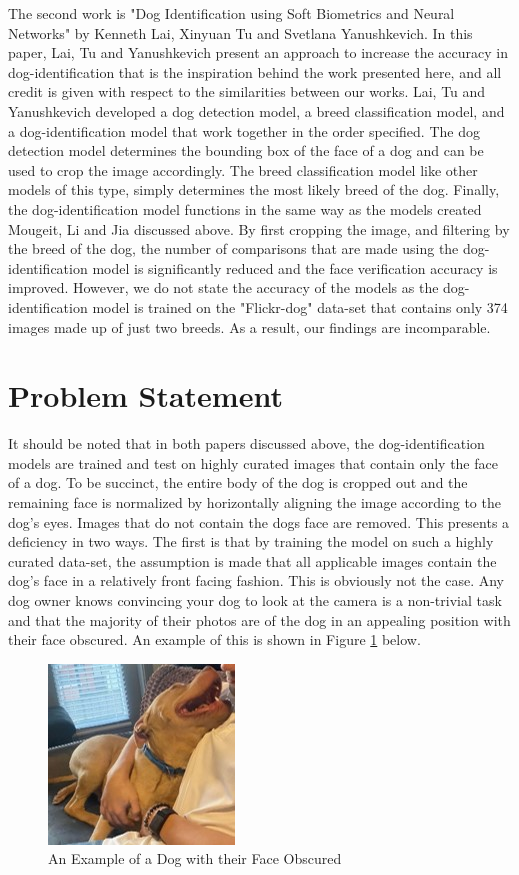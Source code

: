 \documentclass{article}
\begin{document}
	The second work is "Dog Identification using Soft Biometrics and Neural Networks" \cite{LaiKenneth2019DIuS} by Kenneth Lai, Xinyuan Tu and Svetlana Yanushkevich.  In this paper, Lai, Tu and Yanushkevich present an approach to increase the accuracy in dog-identification that is the inspiration behind the work presented here, and all credit is given with respect to the similarities between our works.  Lai, Tu and Yanushkevich developed a dog detection model, a breed classification model, and a dog-identification model that work together in the order specified.   The dog detection model determines the bounding box of the face of a dog and can be used to crop the image accordingly.  The breed classification model like other models of this type, simply determines the most likely breed of the dog.  Finally, the dog-identification model functions in the same way as the models created  Mougeit, Li and Jia discussed above.  By first cropping the image, and filtering by the breed of the dog, the number of comparisons that are made using the dog-identification model is significantly reduced and the face verification accuracy is improved.  However, we do not state the accuracy of the models as the dog-identification model is trained on the "Flickr-dog" \cite{LaiKenneth2019DIuS} data-set that contains only 374 images made up of just two breeds.  As a result, our findings are incomparable.

\section{Problem Statement}
	It should be noted that in both papers discussed above, the dog-identification models are trained and test on highly curated images that contain only the face of a dog.  To be succinct, the entire body of the dog is cropped out and the remaining face is normalized by horizontally aligning the image according to the dog's eyes.  Images that do not contain the dogs face are removed.  This presents a deficiency in two ways.  The first is that by training the model on such a highly curated data-set, the assumption is made that all applicable images contain the dog's face in a relatively front facing fashion.  This is obviously not the case.  Any dog owner knows convincing your dog to look at the camera is a non-trivial task and that the majority of their photos are of the dog in an appealing position with their face obscured.  An example of this is shown in Figure \ref{fig:x dog no face} below.  


\begin{figure}[h]
\centering
	\includegraphics{final-report-images/nofacedog.jpg}
\caption{An Example of a Dog with their Face Obscured}
\label{fig:x dog no face}
\end{figure}
\newpage
\end{document}
